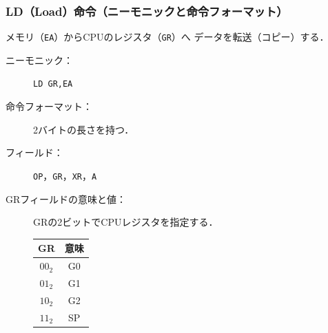 \documentclass[handout]{beamer}        %
\begin{document}
\begin{frame}
  \frametitle{LD（Load）命令（ニーモニックと命令フォーマット）}
  メモリ（\texttt{EA}）からCPUのレジスタ（\texttt{GR}）へ
  データを転送（コピー）する．

  \begin{description}
  \item[ニーモニック：] \texttt{LD GR,EA}
    \vfill

  \item[命令フォーマット：] 2バイトの長さを持つ．\\
    \vfill

  \item[フィールド：] \texttt{OP}，\texttt{GR}，\texttt{XR}，\texttt{A}
    \vfill

  \item[GRフィールドの意味と値：]GRの2ビットでCPUレジスタを指定する．\\
    {\small\begin{center}
      \begin{tabular}{c|c} \hline\hline
        GR & 意味 \\
        \hline
        $00_2$ & G0 \\
        $01_2$ & G1 \\
        $10_2$ & G2 \\
        $11_2$ & SP \\
      \end{tabular}
    \end{center}}
    \vfill

  \end{description}
\end{frame}
\end{document}
